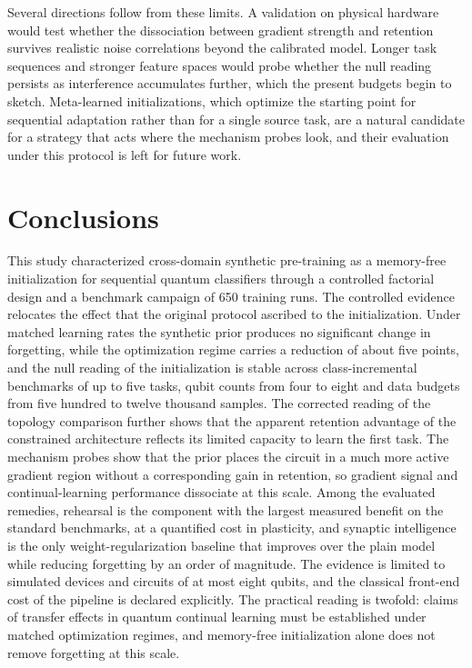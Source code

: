 \documentclass[preprint,number,sort&compress]{elsarticle}
\begin{document}
Several directions follow from these limits. A validation on physical
hardware would test whether the dissociation between gradient strength and
retention survives realistic noise correlations beyond the calibrated
model. Longer task sequences and stronger feature spaces would probe
whether the null reading persists as interference accumulates further,
which the present budgets begin to sketch. Meta-learned initializations,
which optimize the starting point for sequential adaptation rather than
for a single source task, are a natural candidate for a strategy that acts
where the mechanism probes look, and their evaluation under this protocol
is left for future work.

\section{Conclusions}

This study characterized cross-domain synthetic pre-training as a
memory-free initialization for sequential quantum classifiers through a
controlled factorial design and a benchmark campaign of 650 training runs.
The controlled evidence relocates the effect that the original protocol
ascribed to the initialization. Under matched learning rates the
synthetic prior produces no significant change in forgetting, while the
optimization regime carries a reduction of about five points, and the null
reading of the initialization is stable across class-incremental
benchmarks of up to five tasks, qubit counts from four to eight and data
budgets from five hundred to twelve thousand samples. The corrected
reading of the topology comparison further shows that the apparent
retention advantage of the constrained architecture reflects its limited
capacity to learn the first task. The mechanism probes show that the prior
places the circuit in a much more active gradient region without a
corresponding gain in retention, so gradient signal and continual-learning
performance dissociate at this scale. Among the evaluated remedies,
rehearsal is the component with the largest measured benefit on the
standard benchmarks, at a quantified cost in plasticity, and synaptic
intelligence is the only weight-regularization baseline that improves
over the plain model while reducing forgetting by an order of magnitude. The evidence is
limited to simulated devices and circuits of at most eight qubits, and the
classical front-end cost of the pipeline is declared explicitly. The
practical reading is twofold: claims of transfer effects in quantum
continual learning must be established under matched optimization regimes,
and memory-free initialization alone does not remove forgetting at this
scale.
\end{document}
